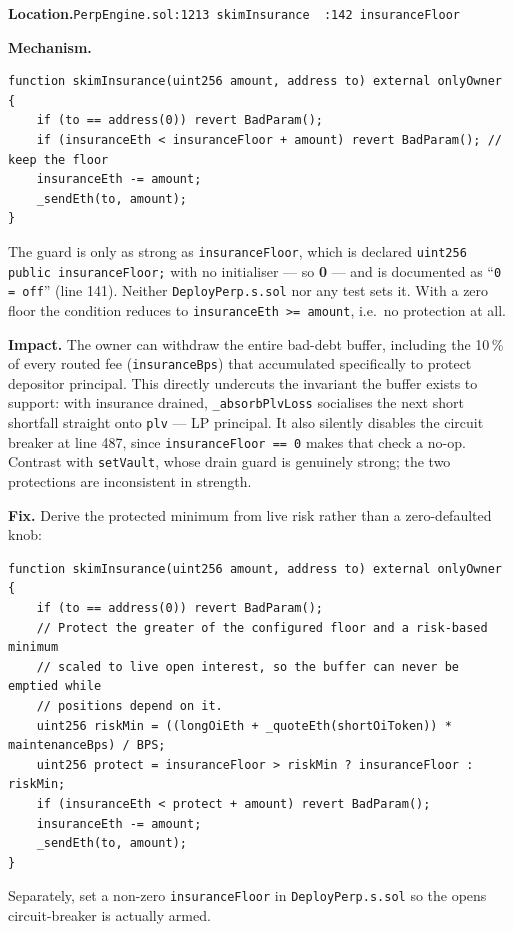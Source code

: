 \documentclass[10pt,a4paper]{article}
\newcommand{\loc}[1]{%
  \smallskip\noindent
  {\raggedright\textbf{Location.}\quad\texttt{\small #1}\par}\smallskip}
\newcommand{\code}[1]{\texttt{\small #1}}
\begin{document}
\loc{PerpEngine.sol:1213 \texttt{skimInsurance} \textbullet\ :142 \texttt{insuranceFloor}}

\textbf{Mechanism.}

\begin{lstlisting}[firstnumber=1213]
function skimInsurance(uint256 amount, address to) external onlyOwner {
    if (to == address(0)) revert BadParam();
    if (insuranceEth < insuranceFloor + amount) revert BadParam(); // keep the floor
    insuranceEth -= amount;
    _sendEth(to, amount);
}
\end{lstlisting}

\noindent The guard is only as strong as \code{insuranceFloor}, which is
declared \code{uint256 public insuranceFloor;} with no initialiser --- so
\textbf{0} --- and is documented as ``\code{0 = off}'' (line 141). Neither
\code{DeployPerp.s.sol} nor any test sets it. With a zero floor the condition
reduces to \code{insuranceEth >= amount}, i.e.\ no protection at all.

\textbf{Impact.} The owner can withdraw the entire bad-debt buffer, including
the 10\,\% of every routed fee (\code{insuranceBps}) that accumulated
specifically to protect depositor principal. This directly undercuts the
invariant the buffer exists to support: with insurance drained,
\code{\_absorbPlvLoss} socialises the next short shortfall straight onto
\code{plv} --- LP principal. It also silently disables the circuit breaker at
line 487, since \code{insuranceFloor == 0} makes that check a no-op. Contrast
with \code{setVault}, whose drain guard is genuinely strong; the two protections
are inconsistent in strength.

\textbf{Fix.} Derive the protected minimum from live risk rather than a
zero-defaulted knob:

\begin{lstlisting}[numbers=none]
function skimInsurance(uint256 amount, address to) external onlyOwner {
    if (to == address(0)) revert BadParam();
    // Protect the greater of the configured floor and a risk-based minimum
    // scaled to live open interest, so the buffer can never be emptied while
    // positions depend on it.
    uint256 riskMin = ((longOiEth + _quoteEth(shortOiToken)) * maintenanceBps) / BPS;
    uint256 protect = insuranceFloor > riskMin ? insuranceFloor : riskMin;
    if (insuranceEth < protect + amount) revert BadParam();
    insuranceEth -= amount;
    _sendEth(to, amount);
}
\end{lstlisting}

\noindent Separately, set a non-zero \code{insuranceFloor} in
\code{DeployPerp.s.sol} so the opens circuit-breaker is actually armed.
\end{document}
